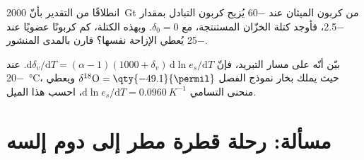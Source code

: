 \begin{exercise}[$\star\star\star$]\label{exo:b3:stable-isotopes:11}
انطلاقًا من التقدير بأنّ \qty{2000}{Gt} من كربون الميثان عند
\qty{-60}{\permil} يُزيح كربون التبادل بمقدار \qty{-2.5}{\permil}،
فأوجد كتلة الخزّان المستنتجة، مع $\delta_0 = 0$. وبهذه الكتلة، كم
كربونًا عضويًا عند \qty{-25}{\permil} يُعطي الإزاحة نفسها؟ قارن
بالمدى المنشور.
\end{exercise}

\begin{exercise}[$\star\star\star$]\label{exo:b3:stable-isotopes:12}
بيّن أنّه على مسار التبريد، فإنّ $\mathrm d\delta_v/\mathrm dT = (\alpha - 1)(1000 +
\delta_v)\,\mathrm d\ln e_s/\mathrm dT$. عند \qty{-20}{\celsius}، حيث
يملك بخار نموذج الفصل $\delta^{18}\mathrm O = \qty{-49.1}{\permil}$
ويعطي منحنى التسامي $\mathrm d\ln e_s/\mathrm dT =
\qty{0.0960}{K^{-1}}$، احسب هذا الميل.
\end{exercise}

\section{مسألة: رحلة قطرة مطر إلى دوم إلسه}


